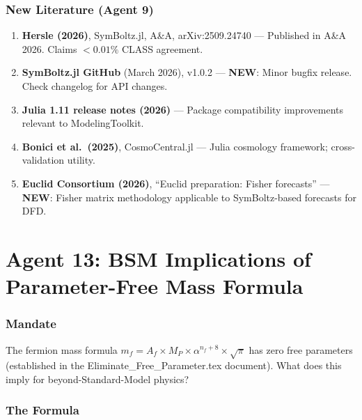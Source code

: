 \documentclass[11pt,a4paper]{article}
\newcommand{\NEW}{\textcolor{dfdblue}{\textbf{NEW}}}
\begin{document}
\section{New Literature (Agent 9)}

\begin{enumerate}
\item \textbf{Hersle (2026)}, SymBoltz.jl, A\&A, arXiv:2509.24740 --- Published in A\&A 2026. Claims $< 0.01\%$ CLASS agreement.

\item \textbf{SymBoltz.jl GitHub} (March 2026), v1.0.2 --- \NEW: Minor bugfix release. Check changelog for API changes.

\item \textbf{Julia 1.11 release notes (2026)} --- Package compatibility improvements relevant to ModelingToolkit.

\item \textbf{Bonici et al.\ (2025)}, CosmoCentral.jl --- Julia cosmology framework; cross-validation utility.

\item \textbf{Euclid Consortium (2026)}, ``Euclid preparation: Fisher forecasts'' --- \NEW: Fisher matrix methodology applicable to SymBoltz-based forecasts for DFD.
\end{enumerate}


\part{Agent 13: BSM Implications of Parameter-Free Mass Formula}
\label{part:agent13}

\section{Mandate}

The fermion mass formula $m_f = A_f \times M_P \times \alpha^{n_f+8} \times \sqrt{\pi}$ has zero free parameters (established in the Eliminate\_Free\_Parameter.tex document). What does this imply for beyond-Standard-Model physics?

\section{The Formula}
\end{document}
